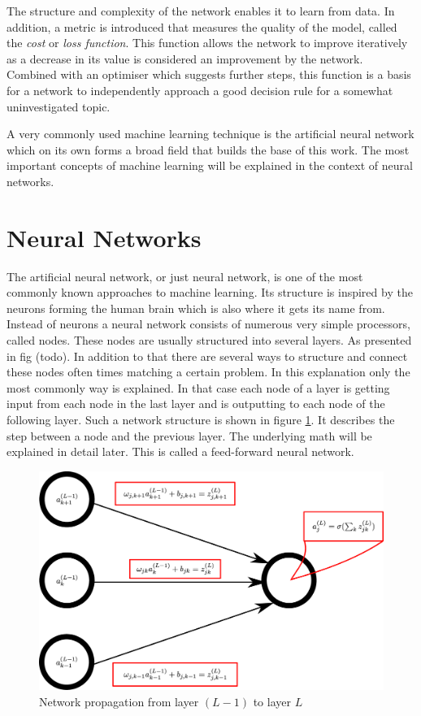 The structure and complexity of the network enables it to learn from data. In addition, a metric is introduced that measures the quality of the model, called the \emph{cost} or \emph{loss function}. This function allows the network to improve iteratively as a decrease in its value is considered an improvement by the network. Combined with an optimiser which suggests further steps, this function is a basis for a network to independently approach a good decision rule for a somewhat uninvestigated topic.

A very commonly used machine learning technique is the artificial neural network which on its own forms a broad field that builds the base of this work. The most important concepts of machine learning will be explained in the context of neural networks.

\section{Neural Networks}

The artificial neural network, or just neural network, is one of the most commonly known approaches to machine learning. Its structure is inspired by the neurons forming the human brain which is also where it gets its name from.\\
Instead of neurons a neural network consists of numerous very simple processors, called nodes. These nodes are usually structured into several layers. As presented in fig (todo). In addition to that there are several ways to structure and connect these nodes often times matching a certain problem. In this explanation only the most commonly way is explained. In that case each node of a layer is getting input from each node in the last layer and is outputting to each node of the following layer. Such a network structure is shown in figure \ref{fig:nodes_nomenclature}. It describes the step between a node and the previous layer. The underlying math will be explained in detail later. This is called a feed-forward neural network.

\begin{figure}
	\centering
	\includegraphics[scale=0.18]{figures_ML/nodes_nomenclature.eps}
	\caption{Network propagation from layer $(L-1)$ to layer $L$}
	\label{fig:nodes_nomenclature}
\end{figure}


